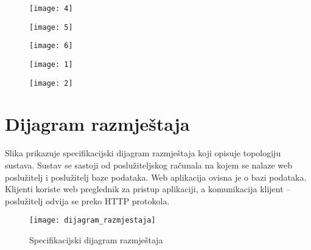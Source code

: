 {\begin{figure}[H]
		 	\texttt{[image: 4]}
		 	\caption{}
		 	
		 \end{figure}
	 
	  \begin{figure}[H]
	 	
	 	\texttt{[image: 5]}
	 	\caption{}
	 	
	 \end{figure}
 
  \begin{figure}[H]
 	
 	\texttt{[image: 6]}
 	\caption{}
 	
 \end{figure}
 \begin{figure}[H]
	
	\texttt{[image: 1]}
	\caption{}
	
\end{figure}

 \begin{figure}[H]
	
	\texttt{[image: 2]}
	\caption{}
	
\end{figure}
		
		
		\section{Dijagram razmještaja}
			
			{Slika prikazuje specifikacijski dijagram razmještaja koji opisuje topologiju sustava. Sustav se sastoji od poslužiteljskog računala na kojem se nalaze web poslužitelj i poslužitelj baze podataka. Web aplikacija ovisna je o bazi podataka. Klijenti koriste web preglednik za pristup aplikaciji, a komunikacija klijent – poslužitelj odvija se preko HTTP protokola.}
			 
			 \begin{figure}[H]
			 	
			 	\texttt{[image: dijagram\_razmjestaja]}
			 	\caption{Specifikacijski dijagram razmještaja}
			 	
			 \end{figure}
			
			\eject 
		
}
